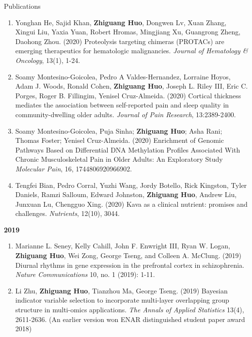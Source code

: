 \documentclass{resume} %
\begin{document}
\begin{rSection}{Publications}
\begin{enumerate}[noitemsep,topsep=0pt, resume]
 
\item
Yonghan He, Sajid Khan, {\bf Zhiguang Huo}, Dongwen Lv, Xuan Zhang, Xingui Liu, Yaxia Yuan, Robert Hromas, Mingjiang Xu, Guangrong Zheng, Daohong Zhou. (2020)
Proteolysis targeting chimeras (PROTACs) are emerging therapeutics for hematologic malignancies.
\emph{Journal of Hematology \& Oncology}, 13(1), 1-24.

\item  
Soamy Montesino-Goicolea, Pedro A Valdes-Hernandez,  Lorraine Hoyos, Adam J. Woods, Ronald Cohen,  {\bf Zhiguang Huo}, Joseph L. Riley III, Eric C. Porges, Roger B. Fillingim, Yenisel Cruz-Almeida. (2020)
Cortical thickness mediates the association between self-reported pain and sleep quality in community-dwelling older adults. 
\emph{Journal of Pain Research}, 13:2389-2400.


\item
Soamy Montesino-Goicolea, Puja Sinha; {\bf Zhiguang Huo}; Asha Rani; Thomas Foster; Yenisel Cruz-Almeida. (2020)
Enrichment of Genomic Pathways Based on Differential DNA Methylation Profiles Associated With Chronic Musculoskeletal Pain in Older Adults: An Exploratory Study
\emph{Molecular Pain}, 16, 1744806920966902.

\item  
Tengfei Bian, Pedro Corral, Yuzhi Wang, Jordy Botello, Rick Kingston, Tyler Daniels, Ramzi Salloum, Edward Johnston, {\bf Zhiguang Huo}, Andrew Liu,  Junxuan Lu, Chengguo Xing. (2020)
Kava as a clinical nutrient: promises and challenges.
\emph{Nutrients}, 12(10), 3044.




\end{enumerate}


\textbf{2019}
\begin{enumerate}[noitemsep,topsep=0pt,resume]



\item Marianne L. Seney, Kelly Cahill, John F. Enwright III, Ryan W. Logan, {\bf  Zhiguang Huo}, Wei Zong, George Tseng, and Colleen A. McClung. (2019) Diurnal rhythms in gene expression in the prefrontal cortex in schizophrenia. \emph{Nature Communications} 10, no. 1 (2019): 1-11.


\item Li Zhu, {\bf  Zhiguang Huo}, Tianzhou Ma, George Tseng. (2019)
Bayesian indicator variable selection to incorporate multi-layer overlapping group structure in multi-omics applications. 
\emph{The Annals of Applied Statistics} 13(4), 2611-2636. 
(An earlier version won ENAR distinguished student paper award 2018)




\end{enumerate}
\end{rSection}
\end{document}

